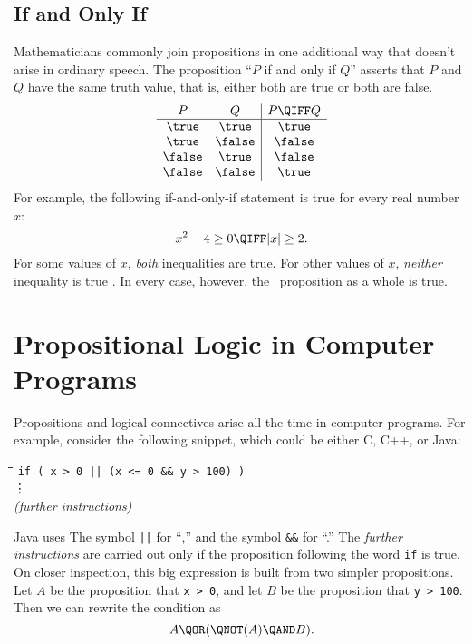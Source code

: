 \subsection{If and Only If}

Mathematicians commonly join propositions in one additional way that
doesn't arise in ordinary speech.  The proposition ``$P$ if and only
if $Q$'' asserts that $P$ and $Q$ have the same truth value, that is,
either both are true or both are false.
%
\[
\begin{array}{cc|c}
P & Q & P \QIFF Q \\ \hline
\true & \true & \true \\
\true & \false & \false \\
\false & \true & \false \\
\false & \false & \true
\end{array}
\]
For example, the following if-and-only-if statement is true for every real
number $x$:
%
\[
x^2 - 4 \geq 0 \QIFF |x| \geq 2.
\]
%
For some values of $x$, \textit{both} inequalities are true.  For
other values of $x$, \textit{neither} inequality is true .  In every
case, however, the \QIFF\ proposition as a whole is true.

\begin{problems}
\practiceproblems
{}

\classproblems
{}

\homeworkproblems
{}
\end{problems}


\section{Propositional Logic in Computer Programs}\label{propositions_in_programs_sec}

Propositions and logical connectives arise all the time in computer
programs.  For example, consider the following snippet, which could be
either C, C++, or Java:
%
\begin{tabbing}
\hspace{1in} \= \quad\quad \= \quad\quad \= \quad\quad \= \kill
\> \texttt{if ( x > 0 || (x <= 0 \&\& y > 100) )} \\
\> \> \vdots\\
\> \textit{(further instructions)}
\end{tabbing}
%
Java uses The symbol \texttt{||} for ``\QOR,'' and the
symbol \texttt{\&\&} for ``\QAND.''  The \textit{further instructions}
are carried out only if the proposition following the word \texttt{if}
is true.  On closer inspection, this big expression is built from two
simpler propositions.  Let $A$ be the proposition that \texttt{x > 0},
and let $B$ be the proposition that \texttt{y > 100}.  Then we can
rewrite the condition as
\begin{equation}\label{ANAB}
A \QOR (\QNOT(A) \QAND B).
\end{equation}

